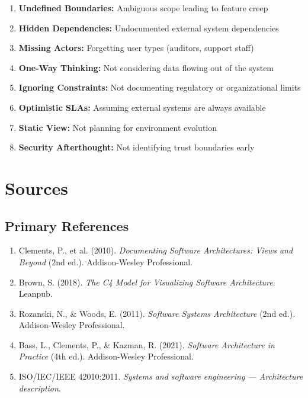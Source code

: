 \documentclass[11pt,letterpaper]{article}
\begin{document}
\begin{warningbox}
\begin{enumerate}[nosep]
    \item \textbf{Undefined Boundaries:} Ambiguous scope leading to feature creep
    \item \textbf{Hidden Dependencies:} Undocumented external system dependencies
    \item \textbf{Missing Actors:} Forgetting user types (auditors, support staff)
    \item \textbf{One-Way Thinking:} Not considering data flowing out of the system
    \item \textbf{Ignoring Constraints:} Not documenting regulatory or organizational limits
    \item \textbf{Optimistic SLAs:} Assuming external systems are always available
    \item \textbf{Static View:} Not planning for environment evolution
    \item \textbf{Security Afterthought:} Not identifying trust boundaries early
\end{enumerate}
\end{warningbox}

\section{Sources}

\subsection{Primary References}

\begin{enumerate}
    \item Clements, P., et al. (2010). \textit{Documenting Software Architectures: Views and Beyond} (2nd ed.). Addison-Wesley Professional.
    
    \item Brown, S. (2018). \textit{The C4 Model for Visualizing Software Architecture}. Leanpub.
    
    \item Rozanski, N., \& Woods, E. (2011). \textit{Software Systems Architecture} (2nd ed.). Addison-Wesley Professional.
    
    \item Bass, L., Clements, P., \& Kazman, R. (2021). \textit{Software Architecture in Practice} (4th ed.). Addison-Wesley Professional.
    
    \item ISO/IEC/IEEE 42010:2011. \textit{Systems and software engineering --- Architecture description}.
\end{enumerate}
\end{document}
